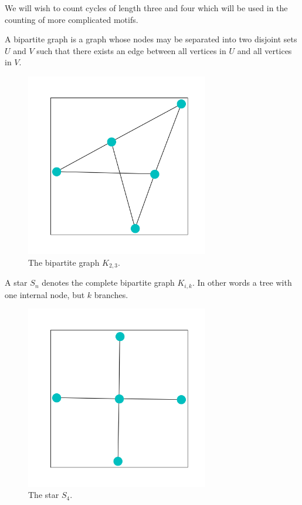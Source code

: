\noindent We will wish to count cycles of length three and four which will be used in the counting of more complicated motifs.

\begin{dfn}
    A bipartite graph is a graph whose nodes may be separated into two disjoint sets $U$ and $V$
    such that there exists an edge between all vertices in $U$ and all vertices in $V$.
\end{dfn}

\begin{figure}[h!]
    \includegraphics[width=8cm]{Images/Bipartite.png}
    \centering
    \caption{The bipartite graph $K_{2,3}$.}
\end{figure}

\FloatBarrier

\begin{dfn}
    A star $S_n$ denotes the complete bipartite graph $K_{i,k}$. In other words 
    a tree with one internal node, but $k$ branches.
\end{dfn}

\begin{figure}[h!]
    \includegraphics[width=8cm]{Images/Star.png}
    \centering
    \caption{The star $S_4$.}
\end{figure}


